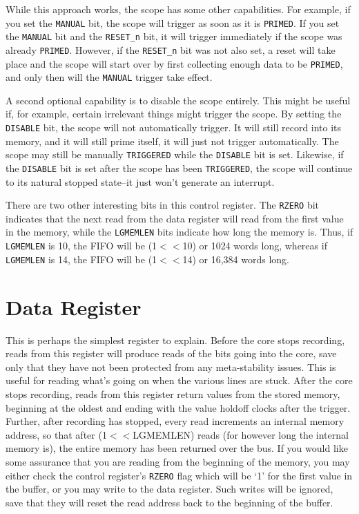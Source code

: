 \documentclass{gqtekspec}
\begin{document}
While this approach works, the scope has some other capabilities.  For example,
if you set the {\tt MANUAL} bit, the scope will trigger as soon as it is {\tt PRIMED}.
If you set the {\tt MANUAL} bit and the {\tt RESET\_n} bit, it will trigger
immediately if the scope was already {\tt PRIMED}.  However, if the
{\tt RESET\_n} bit was not also set, a reset will take place and the scope
will start over by first collecting enough data to be {\tt PRIMED}, and only
then will the {\tt MANUAL} trigger take effect.

A second optional capability is to disable the scope entirely.  This might be
useful if, for example, certain irrelevant things might trigger the scope.
By setting the {\tt DISABLE} bit, the scope will not automatically trigger.  It
will still record into its memory, and it will still prime itself, it will just
not trigger automatically.  The scope may still be manually {\tt TRIGGERED}
while the {\tt DISABLE} bit is set.  Likewise, if the {\tt DISABLE} bit is set
after the scope has been {\tt TRIGGERED}, the scope will continue to its
natural stopped state--it just won't generate an interrupt.

There are two other interesting bits in this control register.  The {\tt RZERO}
bit indicates that the next read from the data register will read from the first
value in the memory, while the {\tt LGMEMLEN} bits indicate how long the memory is.  Thus, if {\tt LGMEMLEN} is 10, the FIFO will be (1$<<$10) or 1024 words
long, whereas if {\tt LGMEMLEN} is 14, the FIFO will be (1$<<$14) or 16,384 words
long.

\section{Data Register}

This is perhaps the simplest register to explain.  Before the core stops
recording, reads from this register will produce reads of the bits going into
the core, save only that they have not been protected from any meta-stability
issues.  This is useful for reading what's going on when the various lines are
stuck.  After the core stops recording, reads from this register return values
from the stored memory, beginning at the oldest and ending with the value
holdoff clocks after the trigger.  Further, after recording has stopped, every
read increments an internal memory address, so that after (1$<<$LGMEMLEN)
reads (for however long the internal memory is), the entire memory has been
returned over the bus.
If you would like some assurance that you are reading from the beginning of the
memory, you may either check the control register's {\tt RZERO} flag which will
be `1' for the first value in the buffer, or you may write to the data register.
Such writes will be ignored, save that they will reset the read address back
to the beginning of the buffer.
 
\end{document}
